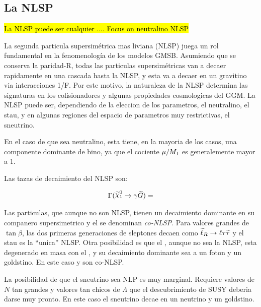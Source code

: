 
\subsection{La NLSP}

\hl{La NLSP puede ser cualquier .... Focus on neutralino NLSP}

La segunda particula supersimétrica mas liviana (NLSP) juega un rol
fundamental en la fenomenología de los modelos GMSB. Asumiendo que se
conserva la paridad-R, todas las particulas supersimétricas van a decaer
rapidamente en una cascada hasta la NLSP, y esta va a decaer en un gravitino
via interacciones 1/F. Por este motivo, la naturaleza de la NLSP
determina las signaturas en los colisionadores y algunas propiedades
cosmologicas del GGM. La NLSP puede ser, dependiendo de la eleccion 
de los parametros, el neutralino, el stau, y en algunas regiones del
espacio de parametros muy restrictivas, el sneutrino.

En el caso de que sea neutralino, esta tiene, en la mayoria de los
casos, una componente dominante de bino, ya que el cociente $\mu/M_{1}$
es generalemente mayor a 1. %

Las tazas de decaimiento del {\ninoone} NLSP son:

\begin{align}
  \Gamma (\ninoone \to \gamma \gravino) =
\end{align}

Las particulas, que aunque no son NLSP, tienen un decaimiento dominante en
su companero supersimetrico y el {\gravino} se denominan \emph{co-NLSP}.
Para valores grandes de $\tan \beta$, las dos primeras generaciones de
sleptones decaen como $\widetilde{\ell}_R \rightarrow \ell \tau \widetilde{\tau}$ y el stau
es la ``unica'' NLSP. Otra posibilidad es que el {\ninoone}, aunque no sea
la NLSP, esta degenerado en masa con el {\stau}, y su decaimiento dominante
sea a un foton y un goldstino. En este caso {\stau} y {\ninoone} son co-NLSP.

La posibilidad de que el sneutrino sea NLP es muy marginal. Requiere valores
de $N$ tan grandes y valores tan chicos de $\Lambda$ que el descubrimiento de
SUSY deberia darse muy pronto. En este caso el sneutrino decae en un neutrino
y un goldstino.

